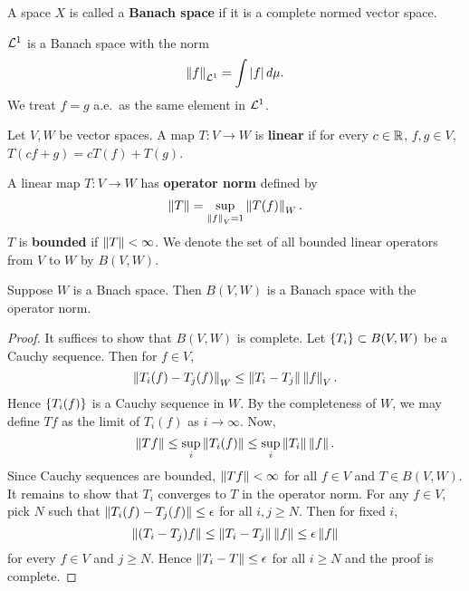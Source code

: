 \begin{definition}
    A space $X$ is called a \textbf{Banach space} if it is a 
    complete normed vector space.
\end{definition}
\begin{remark}
    $\mathcal{L}^1$ is a Banach space with the norm 
    \begin{equation*}
        \left\lVert {f} \right\rVert_{\mathcal{L}^1} = \int \left\lvert {f} \right\rvert d\mu.
    \end{equation*}
    We treat $f = g$ a.e.\ as the same element in $\mathcal{L}^1$.
\end{remark}

\begin{definition}
    Let $V,W$ be vector spaces. A map $T:V\to W$ is \textbf{linear} 
    if for every $c\in\mathbb{R}$, $f,g\in V$, $T(cf+g) = cT(f)+T(g)$.
\end{definition} 

\begin{definition}
    A linear map $T:V\to W$ has \textbf{operator norm} defined 
    by 
    \begin{equation*}
        \left\lVert {T} \right\rVert = \sup_{\left\lVert {f} \right\rVert_V=1}\left\lVert {T(f)} \right\rVert_W.
    \end{equation*} 
    $T$ is \textbf{bounded} if $\left\lVert {T} \right\rVert<\infty$. We denote the 
    set of all bounded linear operators from $V$ to $W$ by 
    $B(V,W)$. 
\end{definition}

\begin{proposition}
    Suppose $W$ is a Bnach space. Then $B(V,W)$ is a Banach 
    space with the operator norm.
\end{proposition}
\begin{proof}
    It suffices to show that $B(V,W)$ is complete. Let 
    $\left\{ {T_i} \right\}\subset B(V,W)$ be a Cauchy sequence. Then for 
    $f\in V$, 
    \begin{equation*}
        \left\lVert {T_i(f)-T_j(f)} \right\rVert_W \leq \left\lVert {T_i-T_j} \right\rVert\left\lVert {f} \right\rVert_V.
    \end{equation*} 
    Hence $\left\{ {T_i(f)} \right\}$ is a Cauchy sequence in $W$. By the 
    completeness of $W$, we may define $Tf$ as the limit of 
    $T_i(f)$ as $i\to\infty$. Now, 
    \begin{equation*}
        \left\lVert {Tf} \right\rVert \leq \sup_i\left\lVert {T_i(f)} \right\rVert \leq \sup_i \left\lVert {T_i} \right\rVert\left\lVert {f} \right\rVert.
    \end{equation*}
    Since Cauchy sequences are bounded, $\left\lVert {Tf} \right\rVert < \infty$ for 
    all $f\in V$ and $T\in B(V,W)$. It remains to show that 
    $T_i$ converges to $T$ in the operator norm. For any $f\in V$, 
    pick $N$ such that $\left\lVert {T_i(f)-T_j(f)} \right\rVert\leq\epsilon$ for all 
    $i,j\geq N$. Then for fixed $i$, 
    \begin{equation*}
        \left\lVert {(T_i-T_j)f} \right\rVert \leq \left\lVert {T_i-T_j} \right\rVert\left\lVert {f} \right\rVert \leq \epsilon\left\lVert {f} \right\rVert 
    \end{equation*}
    for every $f\in V$ and $j\geq N$. Hence $\left\lVert {T_i - T} \right\rVert\leq\epsilon$ 
    for all $i\geq N$ and the proof is complete.
\end{proof} 

